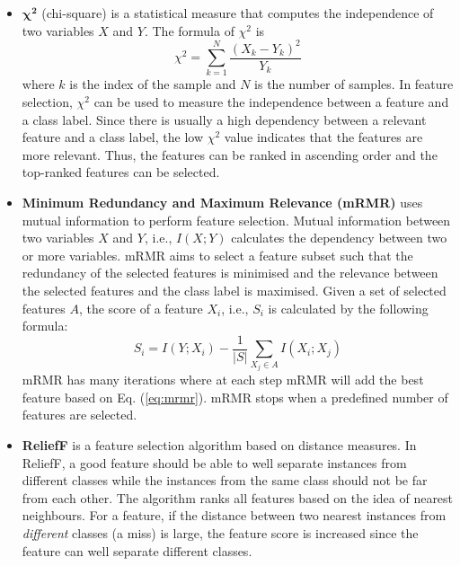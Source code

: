 \documentclass[runningheads]{llncs}
\begin{document}
\begin{itemize}
  \item $\boldsymbol{\chi^2}$ (chi-square) \cite{liu1995chi2} is a statistical measure that computes the independence of two variables $X$ and $Y$. The formula of $\chi^2$ is
        \begin{equation}
          \chi^2 = \sum_{k=1}^N \frac{(X_{k} - Y_{k})^2}{Y_{k}}
          \label{eq:chi}
        \end{equation}
        where $k$ is the index of the sample and $N$ is the number of samples. 
        In feature selection, $\chi^2$ can be used to measure the independence between a feature and a class label. 
        Since there is usually a high dependency between a relevant feature and a class label, the low $\chi^2$ value indicates that the features are more relevant. 
        Thus, the features can be ranked in ascending order and the top-ranked features can be selected. 
  \item \textbf{Minimum Redundancy and Maximum Relevance (mRMR)} \cite{ding2005minimum} uses mutual information to perform feature selection.
        Mutual information between two variables $X$ and $Y$, i.e., $I(X; Y)$ calculates the dependency between two or more variables. 
        mRMR aims to select a feature subset such that the redundancy of the selected features is minimised and the relevance between the selected features and the class label is maximised. 
        Given a set of selected features $A$, the score of a feature $X_i$, i.e., $S_i$ is calculated by the following formula:
        \begin{equation}
          S_i = I(Y; X_i) - \frac{1}{|S|} \sum_{X_j \in A} I(X_i; X_j) 
          \label{eq:mrmr}
        \end{equation}
        mRMR has many iterations where at each step mRMR will add the best feature based on Eq. (\ref{eq:mrmr}). 
        mRMR stops when a predefined number of features are selected. 
  \item \textbf{ReliefF} \cite{robnik2003theoretical} is a feature selection algorithm based on distance measures.
        In ReliefF, a good feature should be able to well separate instances from different classes while the instances from the same class should not be far from each other. 
        The algorithm ranks all features based on the idea of nearest neighbours. 
        For a feature, if the distance between two nearest instances from \textit{different} classes (a miss) is large, the feature score is increased since the feature can well separate different classes. 

\end{itemize}
\end{document}
